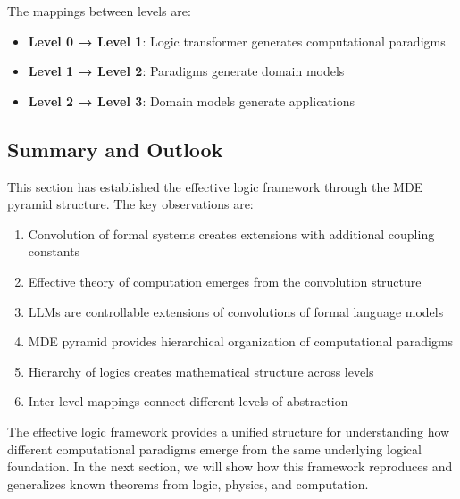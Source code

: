 \begin{definition}
\label{def:inter-level-mappings}
The mappings between levels are:
\begin{itemize}
\item \textbf{Level 0 → Level 1}: Logic transformer generates computational paradigms
\item \textbf{Level 1 → Level 2}: Paradigms generate domain models
\item \textbf{Level 2 → Level 3}: Domain models generate applications
\end{itemize}
\end{definition}

\subsection{Summary and Outlook}

This section has established the effective logic framework through the MDE pyramid structure. The key observations are:

\begin{enumerate}
\item Convolution of formal systems creates extensions with additional coupling constants
\item Effective theory of computation emerges from the convolution structure
\item LLMs are controllable extensions of convolutions of formal language models
\item MDE pyramid provides hierarchical organization of computational paradigms
\item Hierarchy of logics creates mathematical structure across levels
\item Inter-level mappings connect different levels of abstraction
\end{enumerate}

The effective logic framework provides a unified structure for understanding how different computational paradigms emerge from the same underlying logical foundation. In the next section, we will show how this framework reproduces and generalizes known theorems from logic, physics, and computation.